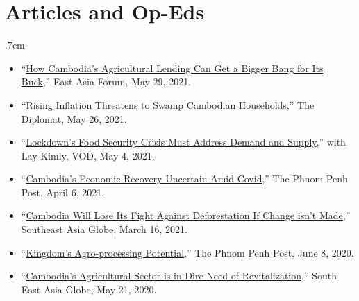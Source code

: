 \documentclass[10pt,a4paper]{article}
\begin{document}
\section*{Articles and Op-Eds}
	\vspace{-1em}
	\begin{adjustwidth}{.7cm}{}
		\begin{itemize}[label={},itemindent=-2em,leftmargin=2em]
			
			\item ``\href{https://www.eastasiaforum.org/2021/05/29/how-cambodias-agricultural-lending-can-get-a-bigger-bang-for-its-buck/}{How Cambodia's Agricultural Lending Can Get a Bigger Bang for Its Buck},'' East Asia Forum, May 29, 2021.
				
			\item ``\href{https://thediplomat.com/2021/05/rising-inflation-threatens-to-swamp-cambodian-households/}{Rising Inflation Threatens to Swamp Cambodian Households},'' The Diplomat, May 26, 2021.
				
			\item ``\href{https://vodenglish.news/opinion-lockdowns-food-security-crisis-must-address-demand-and-supply/}{Lockdown's Food Security Crisis Must Address Demand and Supply},'' with Lay Kimly, VOD, May 4, 2021.
			
			\item “\href{https://www.phnompenhpost.com/opinion/cambodias-economic-recovery-uncertain-amid-covid}{Cambodia's Economic Recovery Uncertain Amid Covid},” The Phnom Penh Post, April 6, 2021. 
				
			\item “\href{https://southeastasiaglobe.com/cambodia-deforestation-fight/}{Cambodia Will Lose Its Fight Against Deforestation If Change isn't Made},” Southeast Asia Globe, March 16, 2021.
			
			\item “\href{https://www.phnompenhpost.com/opinion/kingdoms-agro-processing-potential}{Kingdom’s Agro-processing Potential},” The Phnom Penh Post, June 8, 2020. 
			
			\item “\href{https://southeastasiaglobe.com/cambodias-agricultural-sector-is-one-in-dire-need-of-revitalising}{Cambodia’s Agricultural Sector is in Dire Need of Revitalization},” South East Asia Globe, May 21, 2020. 
				
				
		\end{itemize}
	\end{adjustwidth}			
	\vspace{-1em}
\end{document}
